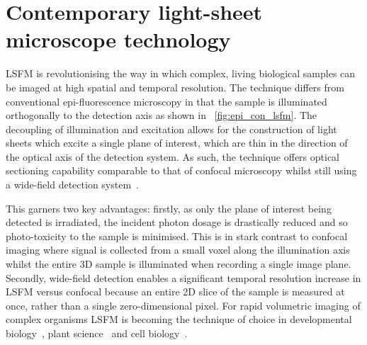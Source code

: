 \ifpdf
    \graphicspath{{Chapters/literature/Figs/Raster/}{Chapters/literature/Figs/PDF/}{Chapters/literature/Figs/}}
\else
    \graphicspath{{Chapters/literature/Figs/Vector/}{Chapters/Figs/}}
\fi



\chapter{Contemporary \gls{light-sheet} microscope technology}\label{chapter:literature}

\gls{LSFM} is revolutionising the way in which complex, living biological samples can be imaged at high spatial and temporal resolution. %
The technique differs from conventional \gls{epi-fluorescence} microscopy in that the sample is illuminated orthogonally to the detection axis as shown in \figurename~\ref{fig:epi_con_lsfm}.
The decoupling of illumination and excitation allows for the construction of light sheets which excite a single plane of interest, which are thin in the direction of the optical axis of the detection system.%
As such, the technique offers \gls{optical sectioning} capability comparable to that of confocal microscopy whilst still using a \gls{wide-field} detection system~\cite{siedentpf_uber_1903,voie_orthogonal-plane_1993,huisken_optical_2004-1}.

This garners two key advantages: firstly, as only the plane of interest being detected is irradiated, the incident photon dosage is drastically reduced and so photo-toxicity to the sample is minimised.%
This is in stark contrast to confocal imaging where signal is collected from a small voxel along the illumination axis whilst the entire 3D sample is illuminated when recording a single image plane.
Secondly, \gls{wide-field} detection enables a significant temporal resolution increase in \gls{LSFM} versus confocal because an entire 2D slice of the sample is measured at once, rather than a single zero-dimensional pixel.
For rapid volumetric imaging of complex organisms \gls{LSFM} is becoming the technique of choice in developmental biology~\cite{keller_fast_2010,verveer_high-resolution_2007,mickoleit_high-resolution_2014,icha_using_2016,keller_visualizing_2015,ichikawa_live_2014}, plant science~\cite{wangenheim_rules_2016} and cell biology~\cite{capoulade_quantitative_2011,cella_zanacchi_live-cell_2011}.

